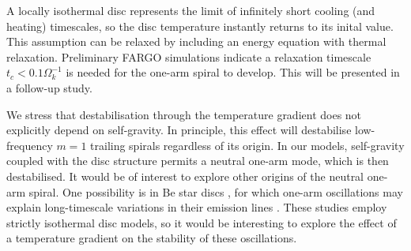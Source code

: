 A locally isothermal disc represents the limit of infinitely short
cooling (and heating) timescales, so the disc temperature instantly
returns to its inital value. %
This assumption can be relaxed by including an energy
equation with thermal relaxation. Preliminary FARGO simulations
indicate a relaxation timescale $t_c < 0.1\Omega_k^{-1}$ is needed for
the one-arm spiral to develop. This will be presented in a follow-up
study. %

We stress that destabilisation through the temperature gradient
does not explicitly depend on self-gravity. In principle, this effect
will destabilise low-frequency $m=1$ trailing spirals regardless of
its origin. In our models, self-gravity coupled with the disc
structure permits a neutral one-arm mode, which is then destabilised. 
It would be of interest to explore other origins of the neutral
one-arm spiral. One possibility is in Be star discs
\citep{rivinius13}, for which 
one-arm oscillations may explain long-timescale variations in their
emission lines \citep[see e.g.][and references
therein]{okasaki97,papaloizou06c,ogilvie08}. These studies employ
strictly isothermal disc models, so it would be interesting to explore
the effect of a temperature gradient on the stability of these
oscillations. 

